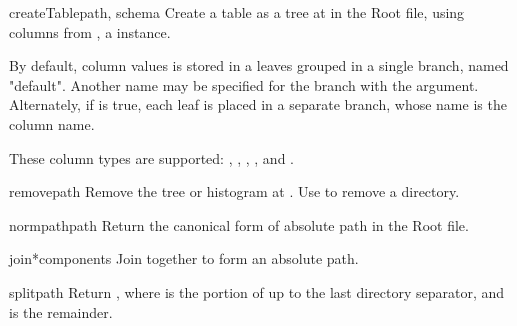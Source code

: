 \begin{methoddesc}{createTable}{path, schema}
 Create a table as a tree at  in the Root file, using
 columns from , a  instance.  

 By default, column values is stored in a leaves grouped in a single
 branch, named "default".  Another name may be specified for the branch
 with the  argument.  Alternately, if
  is true, each leaf is placed in a separate
 branch, whose name is the column name.

 These column types are supported: ,
 , , , and
 .
\end{methoddesc}

\begin{methoddesc}{remove}{path}
 Remove the tree or histogram at .  Use  to
 remove a directory.
\end{methoddesc}

\begin{methoddesc}{normpath}{path}
 Return the canonical form of absolute path  in the Root
 file.
\end{methoddesc}

\begin{methoddesc}{join}{*components}
 Join together  to form an absolute path.
\end{methoddesc}

\begin{methoddesc}{split}{path}
 Return , where  is the portion of 
 up to the last directory separator, and  is the remainder.
\end{methoddesc}

